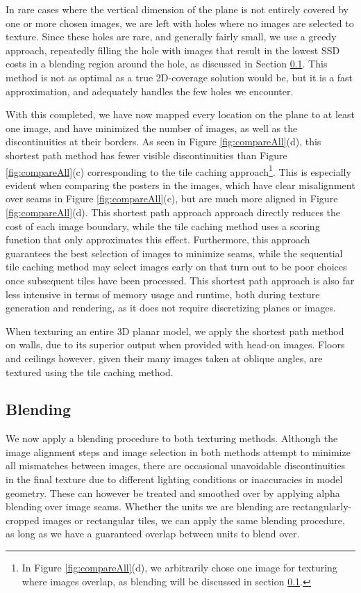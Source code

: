 \documentclass[]{spie}  %
\begin{document}
In rare cases where the vertical dimension of the plane is not
entirely covered by one or more chosen images, we are left with holes
where no images are selected to texture. Since these holes are rare,
and generally fairly small, we use a greedy approach, repeatedly
filling the hole with images that result in the lowest SSD costs in a
blending region around the hole, as discussed in Section
\ref{sec:blending}. This method is not as optimal as a true
2D-coverage solution would be, but it is a fast approximation, and
adequately handles the few holes we encounter.

With this completed, we have now mapped every location on the plane to
at least one image, and have minimized the number of images, as well
as the discontinuities at their borders. As seen in Figure
\ref{fig:compareAll}(d), this shortest path method has fewer visible
discontinuities than Figure \ref{fig:compareAll}(c) corresponding to
the tile caching approach\footnote{In Figure \ref{fig:compareAll}(d),
  we arbitrarily chose one image for texturing where images overlap,
  as blending will be discussed in section \ref{sec:blending}.}. This
is especially evident when comparing the posters in the images, which
have clear misalignment over seams in Figure \ref{fig:compareAll}(c),
but are much more aligned in Figure \ref{fig:compareAll}(d). This
shortest path approach approach directly reduces the cost of each
image boundary, while the tile caching method uses a scoring function
that only approximates this effect. Furthermore, this approach
guarantees the best selection of images to minimize seams, while the
sequential tile caching method may select images early on that turn
out to be poor choices once subsequent tiles have been processed. This
shortest path approach is also far less intensive in terms of memory
usage and runtime, both during texture generation and rendering, as it
does not require discretizing planes or images.

When texturing an entire 3D planar model, we apply the shortest path
method on walls, due to its superior output when provided with head-on
images. Floors and ceilings however, given their many images taken at
oblique angles, are textured using the tile caching method.


\subsection{Blending}
\label{sec:blending}
We now apply a blending procedure to both texturing methods. Although
the image alignment steps and image selection in both methods attempt
to minimize all mismatches between images, there are occasional
unavoidable discontinuities in the final texture due to different
lighting conditions or inaccuracies in model geometry. These can
however be treated and smoothed over by applying alpha blending over
image seams.  Whether the units we are blending are
rectangularly-cropped images or rectangular tiles, we can apply the
same blending procedure, as long as we have a guaranteed overlap
between units to blend over.
\end{document}
